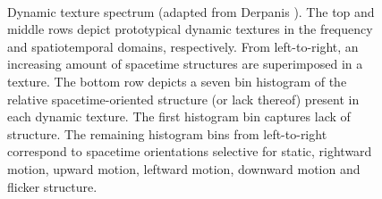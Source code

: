 \begin{figure}[t]
\begin{center}
	\\
	\caption[Spacetime texture spectrum]{Dynamic texture spectrum (adapted from Derpanis \cite{derpanis2012spacetime}). The top and middle rows depict prototypical dynamic textures in the frequency and spatiotemporal domains, respectively. From left-to-right, an increasing amount of spacetime structures are superimposed in a texture. The bottom row depicts a seven bin histogram of the relative spacetime-oriented structure (or lack thereof) present in each dynamic texture. The first histogram bin captures lack of structure. The remaining histogram bins from left-to-right correspond to spacetime orientations selective for static, rightward motion, upward motion, leftward motion, downward motion and flicker structure.}
	\vspace{-0.65cm}
	\label{fig:spacetime_structures}
\end{center}
\end{figure}